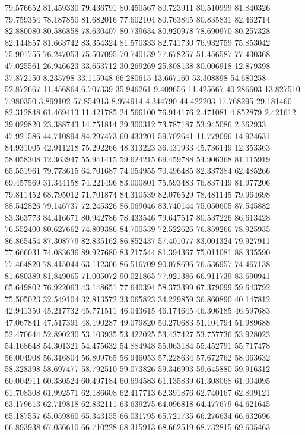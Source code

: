 79.576652
81.459330
79.436791
80.450567
80.723911
80.510999
81.840326
79.759354
78.187850
81.682016
77.602104
80.763845
80.835831
82.462714
82.880080
80.586858
78.630407
80.739634
80.920978
78.690970
80.257328
82.144857
81.663742
83.354324
81.570333
82.741730
76.932759
75.853042
75.901755
76.247053
75.507095
70.740139
77.678257
51.456587
77.430368
47.025561
26.946623
33.653712
30.269269
25.808138
80.006918
12.879398
37.872150
8.235798
33.115948
66.280615
13.667160
53.308898
54.680258
52.872667
11.456864
6.707339
35.946261
9.409656
11.425667
40.286603
13.827510
7.980350
3.899102
57.854913
8.974914
4.344790
44.422203
17.768295
29.181460
82.312848
61.469413
11.421785
24.566100
76.914176
2.471081
4.852879
2.421612
39.029820
23.388743
14.751814
29.300312
73.787187
53.945086
2.362933
47.921586
44.710894
84.297473
60.433201
59.702641
11.779096
14.924631
84.931005
42.911218
75.292266
48.313223
36.431933
45.736149
12.353363
58.058308
12.363947
55.941415
59.624215
69.459788
54.906368
81.115919
65.551961
79.773615
64.701687
74.054955
70.496485
82.337384
62.485266
69.457569
31.344158
74.221496
83.000801
75.593483
76.837449
81.977206
79.811452
68.795012
71.701874
84.310539
82.076529
78.481145
79.964698
88.542826
79.146737
72.245326
86.069046
83.740144
75.050605
87.545882
83.363773
84.416671
80.942786
78.433546
79.647517
80.537226
86.613428
76.552400
80.627662
74.809386
84.700539
72.522626
76.859266
78.925935
86.865454
87.308779
82.835162
86.852437
57.401077
83.001324
79.927911
77.666031
74.083636
89.927680
83.217544
81.394367
75.011081
88.335590
77.464820
78.415044
63.112306
86.516709
90.078696
76.536957
74.467138
81.680389
81.849065
71.005072
90.021865
77.921386
66.911739
83.690941
65.649802
76.922063
43.148651
77.640394
58.373399
67.379099
59.643792
75.505023
32.549104
32.813572
33.065823
34.229859
36.860890
40.147812
42.941350
45.217732
45.771511
46.043615
46.174645
46.306185
46.597683
47.067841
47.517391
48.190287
49.079820
50.270683
51.104794
51.989688
52.470644
52.890230
53.103935
53.422025
53.437427
53.757736
53.928023
54.168648
54.301321
54.475632
54.884948
55.063184
55.452791
55.717478
56.004908
56.316804
56.809765
56.946053
57.228634
57.672762
58.063632
58.328398
58.697477
58.792510
59.073826
59.346993
59.645880
59.916312
60.004911
60.330524
60.497184
60.694583
61.135839
61.308068
61.004095
61.708308
61.992571
62.186608
62.417713
62.391876
62.740167
62.809121
63.179613
62.719818
62.832111
63.639275
64.096818
64.477679
64.621645
65.187557
65.059860
65.343155
66.031795
65.721735
66.276634
66.632696
66.893938
67.036610
66.710228
68.315913
68.662519
68.732815
69.605463
